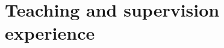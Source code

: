 \documentclass[12pt,a4paper,sans]{moderncv}
\begin{document}

\section{Teaching and supervision experience}
\end{document}
